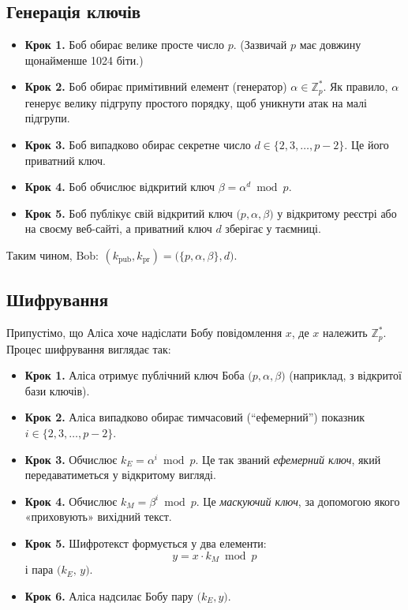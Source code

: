 \documentclass[12pt]{report}
\theoremstyle{definition}
\theoremstyle{plain}
\begin{document}
\subsection{Генерація ключів}

\begin{itemize}
    \item \textbf{Крок 1.} Боб обирає велике просте число \(p\). (Зазвичай \(p\) має довжину щонайменше 1024 біти.)
    \item \textbf{Крок 2.} Боб обирає примітивний елемент (генератор) \(\alpha \in \mathbb{Z}_p^*\). Як правило, \(\alpha\) генерує велику підгрупу простого порядку, щоб уникнути атак на малі підгрупи.
    \item \textbf{Крок 3.} Боб випадково обирає секретне число \(d \in \{2, 3, \dots, p - 2\}\). Це його приватний ключ.
    \item \textbf{Крок 4.} Боб обчислює відкритий ключ \(\beta = \alpha^d \bmod p\).
    \item \textbf{Крок 5.} Боб публікує свій відкритий ключ \(\bigl(p, \alpha, \beta\bigr)\) у відкритому реєстрі або на своєму веб-сайті, а приватний ключ \(d\) зберігає у таємниці.
\end{itemize}

Таким чином, \(\text{Bob}:\ (k_{\text{pub}}, k_{\text{pr}}) = \bigl(\{p, \alpha, \beta\}, d\bigr)\).

\subsection{Шифрування}

Припустімо, що Аліса хоче надіслати Бобу повідомлення \(x\), де \(x\) належить \(\mathbb{Z}_p^*\). Процес шифрування виглядає так:

\begin{itemize}
    \item \textbf{Крок 1.} Аліса отримує публічний ключ Боба \(\bigl(p, \alpha, \beta\bigr)\) (наприклад, з відкритої бази ключів).
    \item \textbf{Крок 2.} Аліса випадково обирає тимчасовий (``ефемерний'') показник \(i \in \{2, 3, \dots, p - 2\}\).
    \item \textbf{Крок 3.} Обчислює \(\displaystyle k_E = \alpha^i \bmod p\). Це так званий \textit{ефемерний ключ}, який передаватиметься у відкритому вигляді.
    \item \textbf{Крок 4.} Обчислює \(\displaystyle k_M = \beta^i \bmod p\). Це \textit{маскуючий ключ}, за допомогою якого «приховують» вихідний текст.
    \item \textbf{Крок 5.} Шифротекст формується у два елементи:
          \[
              y = x \cdot k_M \bmod p
          \]
          і пара \(\bigl(k_E,\, y\bigr)\).
    \item \textbf{Крок 6.} Аліса надсилає Бобу пару \(\bigl(k_E, y\bigr)\).
\end{itemize}
\end{document}
